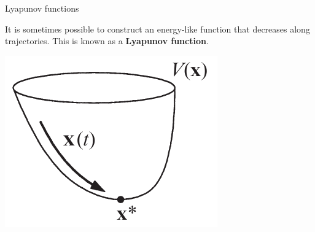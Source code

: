\documentclass[usenames,dvipsnames,svgnames,10pt,aspectratio=169]{beamer}
\begin{document}
\frame{}

\begin{frame}[t, c]{Lyapunov functions}{}
  \begin{minipage}{.68\textwidth}
    It is sometimes possible to construct an energy-like function that decreases along trajectories.
    This is known as a \alert{\textbf{Lyapunov function}}.
  \end{minipage}%
  \hfill
  \begin{minipage}{.28\textwidth}
    \centering
    \includegraphics[width=\textwidth]{lyapunov}
  \end{minipage}
\end{frame}
\end{document}
